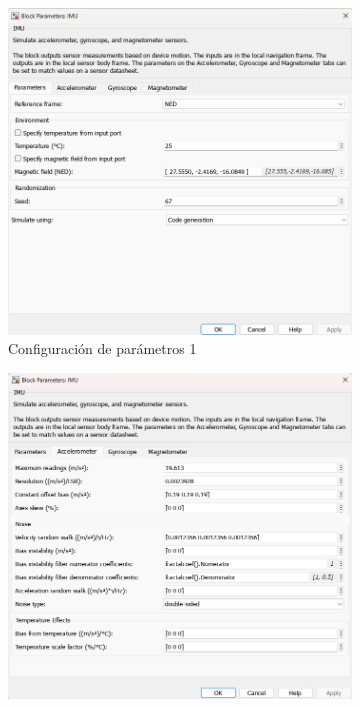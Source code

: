 \begin{figure}[htbp]
\begin{subfigure}[b]{0.45\textwidth}
        \includegraphics[width=\textwidth]{fig/Capitulo5/Caso_de_estudio_IMU/Generador_de_archivos/configuracion_parametros_IMU_01.png}
        \caption{Configuración de parámetros 1}
        \label{fig:parametros_IMU_01}
    \end{subfigure}
    \hfill
    \begin{subfigure}[b]{0.45\textwidth}
        \centering
        \includegraphics[width=\textwidth]{fig/Capitulo5/Caso_de_estudio_IMU/Generador_de_archivos/configuracion_parametros_IMU_02.png}

\end{subfigure}
\end{figure}

